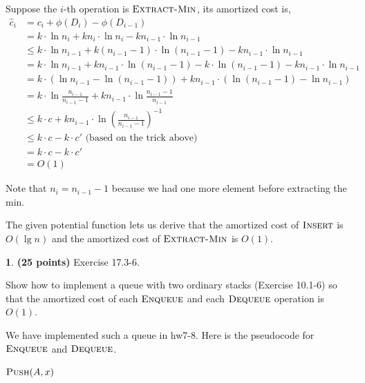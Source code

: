 \documentclass[11pt]{article}
\theoremstyle{definition}
\theoremstyle{theorem}
\newtheorem{prob}{}
\newcommand{\solution}{\medskip\noindent{\color{DarkBlue}\textbf{Solution:}}}
\begin{document}
Suppose the $i$-th operation is $\textproc{\textsc{Extract-Min}}$, its amortized cost is,
\[
\begin{split}
\hat{c}_i &= c_i + \phi(D_i) - \phi(D_{i-1}) \\
& = k \cdot \ln n_i + k n_i \cdot \ln n_i - k n_{i-1} \cdot \ln n_{i-1} \\
& \le k \cdot \ln n_{i-1} + k (n_{i-1} - 1) \cdot \ln (n_{i-1} - 1) - k n_{i-1} \cdot \ln n_{i-1} \\
& = k \cdot \ln n_{i-1} + k n_{i-1} \cdot \ln (n_{i-1} - 1)  - k \cdot \ln (n_{i-1} - 1) - k n_{i-1} \cdot \ln n_{i-1} \\
& = k \cdot (\ln n_{i-1} - \ln (n_{i-1} - 1)) + k n_{i-1} \cdot (\ln (n_{i-1} - 1) - \ln n_{i-1}) \\
& = k \cdot \ln \frac{n_{i-1}}{n_{i-1} - 1} + k n_{i-1} \cdot \ln \frac{n_{i-1} - 1}{n_{i-1}} \\
& \le k \cdot c + k n_{i-1} \cdot \ln (\frac{n_{i-1}}{n_{i-1}-1})^{-1} \\
& \le k \cdot c - k \cdot c' \text{ (based on the trick above) } \\
& = k \cdot c - k \cdot c' \\
& = O(1)
\end{split}
\]

Note that $n_i = n_{i-1} - 1$ because we had one more element before extracting the min.

The given potential function lets us derive that the amortized cost of $\textproc{\textsc{Insert}}$ is $O(\lg n)$ and the amortized cost of $\textproc{\textsc{Extract-Min}}$ is $O(1)$.


\newpage
\begin{prob} \textbf{(25 points)} Exercise 17.3-6.
\end{prob}
Show how to implement a queue with two ordinary stacks (Exercise 10.1-6) so that the amortized cost of each $\textproc{\textsc{Enqueue}}$ and each $\textproc{\textsc{Dequeue}}$ operation is $O(1)$.

\solution

We have implemented such a queue in hw7-8. Here is the pseudocode for $\textproc{\textsc{Enqueue}}$ and $\textproc{\textsc{Dequeue}}$.

\begin{algorithmic}[1]
	\State $\textproc{\textsc{Push}}(A, x)$ 
\EndFunction
\end{algorithmic}
\end{document}
